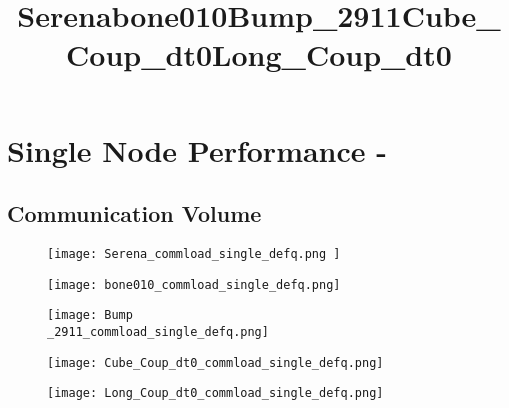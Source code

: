 \section{Single Node Performance - }

\subsection{Communication Volume}

\begin{figure}[H]
    \title{Serena}
    \begin{center}
        \texttt{[image: Serena\_commload\_single\_defq.png ]}
    \end{center}
    \caption{}
    \label{fig:Serena_commload_single_defq.png}
\end{figure}

\begin{figure}[H]
    \title{bone010}
    \begin{center}
        \texttt{[image: bone010\_commload\_single\_defq.png]}
    \end{center}
    \caption{}
    \label{fig:bone010_commload_single_defq.png}
\end{figure}

\begin{figure}[H]
    \title{Bump\_2911}
    \begin{center}
        \texttt{[image: Bump\\\_2911\_commload\_single\_defq.png]}
    \end{center}
    \caption{}
    \label{fig:Bump_2911_defq_commload_single.png}
\end{figure}

\begin{figure}[H]
    \title{Cube\_Coup\_dt0}
    \begin{center}
        \texttt{[image: Cube\_Coup\_dt0\_commload\_single\_defq.png]}
    \end{center}
    \caption{}
    \label{fig:Cube_Coup_dt0_commload_single_defq.png}
\end{figure}

\begin{figure}[H]
    \title{Long\_Coup\_dt0}
    \begin{center}
        \texttt{[image: Long\_Coup\_dt0\_commload\_single\_defq.png]}
    \end{center}
    \caption{}
    \label{fig:Long_Coup_dt0_commload_single_defq.png}
\end{figure}

